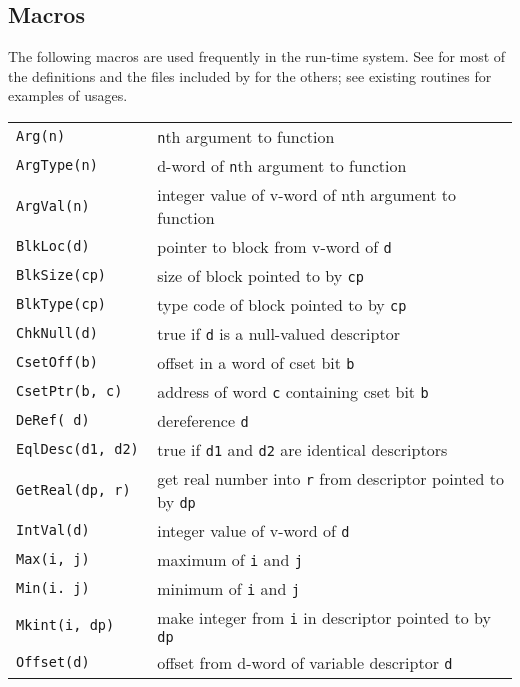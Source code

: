 \subsection{Macros}

The following macros are used frequently in the run-time system.  See
 for most of the definitions and the files included by
 for the others; see existing routines for examples of
usages.\\[0.5cm]
{\renewcommand{\arraystretch}{0.9}%
\begin{xtabular}{>{\hspace{1cm}\texttt\bgroup}l<{\egroup}@{\hspace{1cm}}p{11cm}}
Arg(n)            & \hspace{0cm}\texttt{n}th argument to function\\
ArgType(n)        & d-word of \texttt{n}th argument to function\\
ArgVal(n)         & integer value of v-word of nth argument to function\\
BlkLoc(d)         & pointer to block from v-word of \texttt{d}\\
BlkSize(cp)       & size of block pointed to by \texttt{cp}\\
BlkType(cp)       & type code of block pointed to by \texttt{cp}\\
ChkNull(d)        & true if \texttt{d} is a null-valued descriptor\\
CsetOff(b)        & offset in a word of cset bit \texttt{b}\\
CsetPtr(b, c)     & address of word \texttt{c} containing cset bit \texttt{b}\\
DeRef( d)         & dereference \texttt{d}\\
EqlDesc(d1, d2)   & true if \texttt{d1} and \texttt{d2} are identical descriptors\\
GetReal(dp, r)    & get real number into \texttt{r} from
                    descriptor pointed to by \texttt{dp}\\
IntVal(d)         & integer value of v-word of \texttt{d}\\
Max(i, j)         & maximum of \texttt{i} and \texttt{j}\\
Min(i. j)         & minimum of \texttt{i} and \texttt{j}\\
Mkint(i, dp)      & make integer from \texttt{i} in descriptor
                    pointed to by \texttt{dp}\\
Offset(d)         & offset from d-word of variable descriptor \texttt{d}\\

\end{xtabular}}
